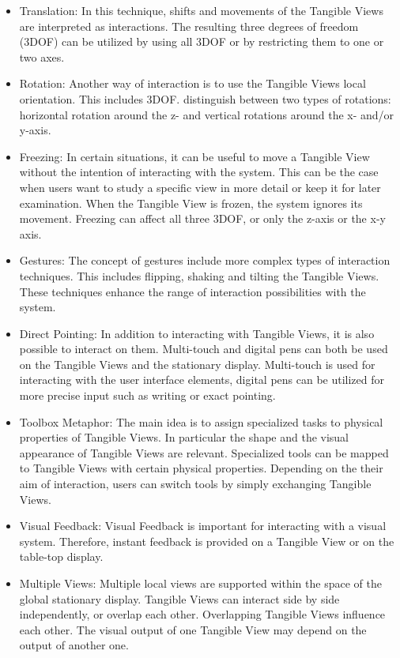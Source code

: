 \begin{itemize}
\item Translation: In this technique, shifts and movements of the Tangible Views are interpreted as interactions. The resulting three degrees of freedom (3DOF) can be utilized by using all 3DOF or by restricting them to one or two axes. 
\item Rotation: Another way of interaction is to use the Tangible Views local orientation. This includes 3DOF. \cite{spindler10} distinguish between two types of rotations: horizontal rotation around the z- and vertical rotations around the x- and/or y-axis. 
\item Freezing: In certain situations, it can be useful to move a Tangible View without the intention of interacting with the system. This can be the case when users want to study a specific view in more detail or keep it for later examination. When the Tangible View is frozen, the system ignores its movement. Freezing can affect all three 3DOF, or only the z-axis or the x-y axis. 
\item Gestures: The concept of gestures include more complex types of interaction techniques. This includes flipping, shaking and tilting the Tangible Views. These techniques enhance the range of interaction possibilities with the system.
\item Direct Pointing: In addition to interacting with Tangible Views, it is also possible to interact on them. Multi-touch and digital pens can both be used on the Tangible Views and the stationary display. Multi-touch is used for interacting with the user interface elements, digital pens can be utilized for more precise input such as writing or exact pointing. 
\item Toolbox Metaphor: The main idea is to assign specialized tasks to physical properties of Tangible Views. In particular the shape and the visual appearance of Tangible Views are relevant. Specialized tools can be mapped to Tangible Views with certain physical properties. Depending on the their aim of interaction, users can switch tools by simply exchanging Tangible Views.
\item Visual Feedback: Visual Feedback is important for interacting with a visual system. Therefore, instant feedback is provided on a Tangible View or on the table-top display.
\item Multiple Views: Multiple local views are supported within the space of the global stationary display. Tangible Views can interact side by side independently, or overlap each other. Overlapping Tangible Views influence each other. The visual output of one Tangible View may depend on the output of another one.
\end{itemize}

